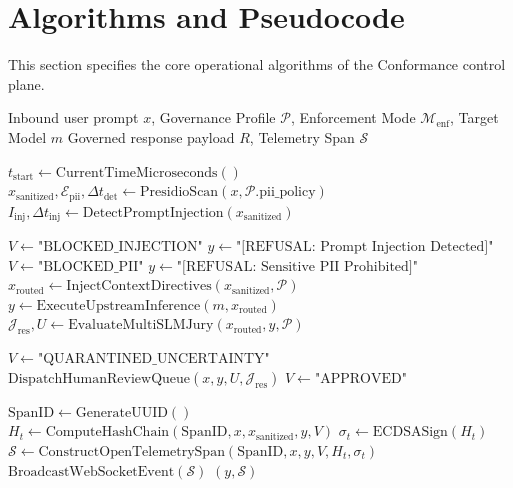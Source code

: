 \documentclass[11pt,a4paper]{article}
\theoremstyle{definition}
\begin{document}
\section{Algorithms and Pseudocode}
\label{sec:algorithms}

This section specifies the core operational algorithms of the Conformance control plane.

\begin{algorithm}[h]
\caption{Inline Runtime Governance Evaluation Pipeline}
\label{alg:inline_eval}
\begin{algorithmic}[1]
\REQUIRE Inbound user prompt $x$, Governance Profile $\mathcal{P}$, Enforcement Mode $\mathcal{M}_{\text{enf}}$, Target Model $m$
\ENSURE Governed response payload $R$, Telemetry Span $\mathcal{S}$

\STATE $t_{\text{start}} \gets \text{CurrentTimeMicroseconds}()$
\STATE $x_{\text{sanitized}}, \mathcal{E}_{\text{pii}}, \Delta t_{\text{det}} \gets \text{PresidioScan}(x, \mathcal{P}.\text{pii\_policy})$
\STATE $I_{\text{inj}}, \Delta t_{\text{inj}} \gets \text{DetectPromptInjection}(x_{\text{sanitized}})$

    \STATE $V \gets \text{"BLOCKED\_INJECTION"}$
    \STATE $y \gets \text{"[REFUSAL: Prompt Injection Detected]"}$
    \STATE $V \gets \text{"BLOCKED\_PII"}$
    \STATE $y \gets \text{"[REFUSAL: Sensitive PII Prohibited]"}$
\ELSE
    \STATE $x_{\text{routed}} \gets \text{InjectContextDirectives}(x_{\text{sanitized}}, \mathcal{P})$
    \STATE $y \gets \text{ExecuteUpstreamInference}(m, x_{\text{routed}})$
    \STATE $\mathcal{J}_{\text{res}}, U \gets \text{EvaluateMultiSLMJury}(x_{\text{routed}}, y, \mathcal{P})$
    
        \STATE $V \gets \text{"QUARANTINED\_UNCERTAINTY"}$
        \STATE $\text{DispatchHumanReviewQueue}(x, y, U, \mathcal{J}_{\text{res}})$
    \ELSE
        \STATE $V \gets \text{"APPROVED"}$
    \ENDIF
\ENDIF

\STATE $\text{SpanID} \gets \text{GenerateUUID}()$
\STATE $H_t \gets \text{ComputeHashChain}(\text{SpanID}, x, x_{\text{sanitized}}, y, V)$
\STATE $\sigma_t \gets \text{ECDSASign}(H_t)$
\STATE $\mathcal{S} \gets \text{ConstructOpenTelemetrySpan}(\text{SpanID}, x, y, V, H_t, \sigma_t)$
\STATE $\text{BroadcastWebSocketEvent}(\mathcal{S})$
\RETURN $(y, \mathcal{S})$
\end{algorithmic}
\end{algorithm}
\end{document}
